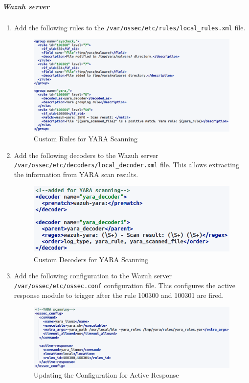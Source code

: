 \subparagraph{Wazuh server}
\begin{enumerate}
    \item Add the following rules to the \texttt{/var/ossec/etc/rules/local\_rules.xml} file.
    \begin{figure}[H]
        \centering
        \includegraphics[width=\textwidth]{images/malware-detection/yara/2.png}
        \caption{Custom Rules for YARA Scanning}
        \label{fig:yara-rules}
    \end{figure}

    \item Add the following decoders to the Wazuh server \texttt{/var/ossec/etc/decoders/local\_decoder.xml} file. This allows extracting the information from YARA scan results.
    \begin{figure}[H]
        \centering
        \includegraphics[width=\textwidth]{images/malware-detection/yara/3.png}
        \caption{Custom Decoders for YARA Scanning}
        \label{fig:yara-decoders}
    \end{figure}

    \item Add the following configuration to the Wazuh server \texttt{/var/ossec/etc/ossec.conf} configuration file. This configures the active response module to trigger after the rule 100300 and 100301 are fired.
    \begin{figure}[H]
        \centering
        \includegraphics[width=\textwidth]{images/malware-detection/yara/4.png}
        \caption{Updating the Configuration for Active Response}
        \label{fig:yara-config}
    \end{figure}
\end{enumerate}

